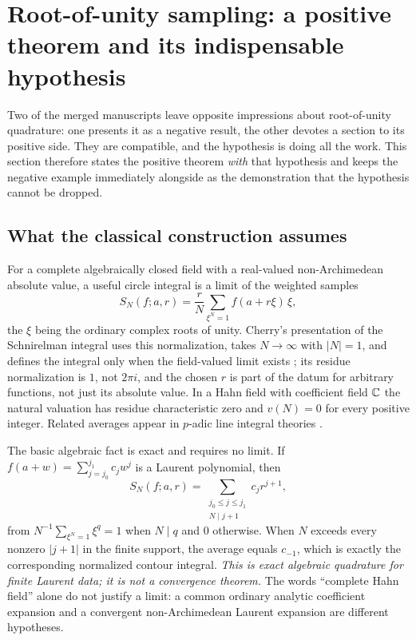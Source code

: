 \documentclass[11pt,letterpaper]{article}
\theoremstyle{definition}
\theoremstyle{remark}
\numberwithin{equation}{section}
\begin{document}
\section{Root-of-unity sampling: a positive theorem and its indispensable
hypothesis}
\label{contours:sec:sampling}

Two of the merged manuscripts leave opposite impressions about root-of-unity
quadrature: one presents it as a negative result, the other devotes a section to its
positive side. They are compatible, and the hypothesis is doing all the work. This
section therefore states the positive theorem \emph{with} that hypothesis and keeps
the negative example immediately alongside as the demonstration that the hypothesis
cannot be dropped.

\subsection{What the classical construction assumes}
For a complete algebraically closed field with a real-valued non-Archimedean
absolute value, a useful circle integral is a limit of the weighted samples
\begin{equation}\label{contours:eq:samples}
  S_N(f;a,r)=\frac rN\sum_{\xi^N=1}f(a+r\xi)\,\xi ,
\end{equation}
the $\xi$ being the ordinary complex roots of unity. Cherry's presentation of the
Schnirelman integral uses this normalization, takes $N\to\infty$ with $|N|=1$, and
defines the integral only when the field-valued limit exists \cite[\S1.3]{Cherry};
its residue normalization is $1$, not $2\pi i$, and the chosen $r$ is part of the
datum for arbitrary functions, not just its absolute value. In a Hahn field with
coefficient field $\mathbb C$ the natural valuation has residue characteristic zero and
$v(N)=0$ for every positive integer. Related averages appear in $p$-adic line
integral theories \cite{Diamond,Ettayb}.

The basic algebraic fact is exact and requires no limit. If
$f(a+w)=\sum_{j=j_0}^{j_1}c_jw^j$ is a Laurent polynomial, then
\begin{equation}\label{contours:eq:rootaverage}
  S_N(f;a,r)=\sum_{\substack{j_0\le j\le j_1\\ N\mid j+1}}c_jr^{j+1},
\end{equation}
from $N^{-1}\sum_{\xi^N=1}\xi^q=1$ when $N\mid q$ and $0$ otherwise. When $N$
exceeds every nonzero $|j+1|$ in the finite support, the average equals $c_{-1}$,
which is exactly the corresponding normalized contour integral. \emph{This is exact
algebraic quadrature for finite Laurent data; it is not a convergence theorem.} The
words ``complete Hahn field'' alone do not justify a limit: a common ordinary
analytic coefficient expansion and a convergent non-Archimedean Laurent expansion
are different hypotheses.
\end{document}
